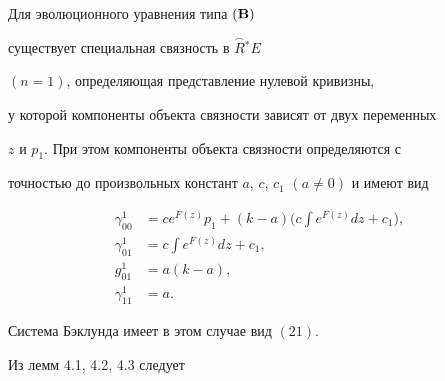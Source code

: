 \begin{lems}


Для эволюционного уравнения типа $(\bold B)$


существует специальная связность в $\overset{\frown}{R}{}^*E$


$({n=1})$, определяющая представление нулевой кривизны,


у которой компоненты объекта связности зависят от двух переменных


$z$ и $p_1$. При этом компоненты объекта связности определяются с 


точностью до произвольных констант $a$, $c$, $c_1$ $({a \ne 0})$ и имеют вид


\begin{align*}


\gamma_{00}^1&=c e^{F (z)} p_1+ ({k-a}) 


\bigg({c\int {e^{F (z)} dz+c_1}}\bigg), \\


\gamma_{01}^1&=c\int {e^{F (z)} dz+c_1,} \\


g_{01}^1&=a ({k-a}), \\


\gamma_{11}^1&=a.


\end{align*}





Система Бэклунда имеет в этом случае вид $(21)$.


\end{lems}





Из лемм 4.1, 4.2, 4.3 следует





